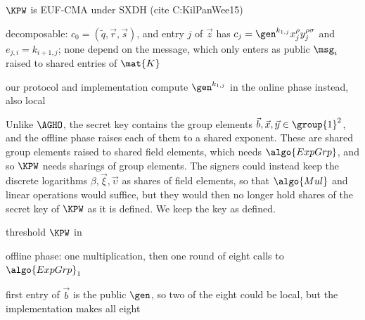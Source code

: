 \begin{outline}
  \item $\KPW$ is EUF-CMA under SXDH (cite C:KilPanWee15)
  \item decomposable: $c_0 = (\widetilde{q}, \vec{r}, \vec{s})$, and entry $j$ of
$\vec{z}$ has $c_j = \gen^{k_{1,j}} x_j^{\rho} y_j^{\rho\sigma}$ and $e_{j,i} =
k_{i+1,j}$; none depend on the message, which only enters as public $\msg_i$
raised to shared entries of $\mat{K}$
  \item our protocol and implementation compute $\gen^{k_{1,j}}$ in the online
phase instead, also local
\end{outline}

Unlike $\AGHO$, the secret key contains the group elements $\vec{b}, \vec{x},
\vec{y} \in \group{1}^2$, and the offline phase raises each of them to a shared
exponent. These are shared group elements raised to shared field elements, which
needs $\algo{ExpGrp}$, and so $\KPW$ needs sharings of group elements.
The signers could instead keep the discrete logarithms $\beta, \vec{\xi},
\vec{\upsilon}$ as shares of field elements, so that $\algo{Mul}$ and linear
operations would suffice, but they would then no longer hold shares of the
secret key of $\KPW$ as it is defined. We keep the key as defined.

\begin{outline}
  \item threshold $\KPW$ in 
  \item offline phase: one multiplication, then one round of eight calls to
$\algo{ExpGrp}_1$
  \item first entry of $\vec{b}$ is the public $\gen$, so two of the eight could
be local, but the implementation makes all eight
\end{outline}

